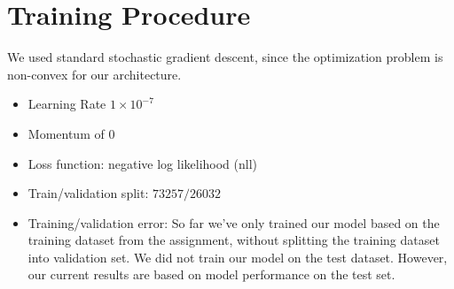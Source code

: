 \documentclass{article}
\begin{document}
\section{Training Procedure}
We used standard stochastic gradient descent, since the optimization problem is
non-convex for our architecture. 
\begin{itemize}
\item Learning Rate $1 \times 10^{-7}$
\item Momentum of $0$
\item Loss function: negative log likelihood (nll)
\item Train/validation split: $73257/26032$
\item Training/validation error: So far we’ve only trained our model based on the training dataset from the assignment, without splitting the training dataset into validation set. We did not train our model on the test dataset. However, our current results are based on model performance on the test set. 
\end{itemize}



\end{document}
